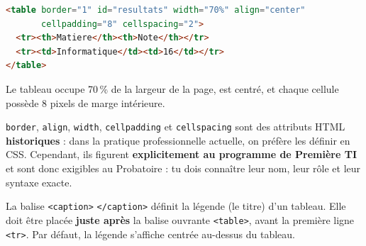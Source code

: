 \documentclass[11pt]{article}
\newcommand{\cle}[1]{{\popxbold\color{popdark}#1}}
\newcounter{popsec}
\newcounter{popsub}
\newcommand{\courssub}[1]{%
  \stepcounter{popsub}%
  \par\vspace{9pt}\noindent{\popxbold\fontsize{11.5}{13}\selectfont\color{popink}{\color{poporange}\thepopsec.\thepopsub}\hspace{6pt}#1}\par\nopagebreak\vspace{4pt}
}
\newcommand{\legende}[1]{\par\vspace{6pt}{\popsemi\fontsize{9}{11.5}\selectfont\color{popmuted}#1}}
\begin{document}
\begin{popfigure}
\end{popfigure}

\begin{exemplebox}
\begin{lstlisting}[language=HTML]
<table border="1" id="resultats" width="70%" align="center"
       cellpadding="8" cellspacing="2">
  <tr><th>Matiere</th><th>Note</th></tr>
  <tr><td>Informatique</td><td>16</td></tr>
</table>
\end{lstlisting}
Le tableau occupe 70\,\% de la largeur de la page, est centré, et chaque cellule possède 8 pixels de marge intérieure.
\end{exemplebox}

\begin{attention}
\texttt{border}, \texttt{align}, \texttt{width}, \texttt{cellpadding} et \texttt{cellspacing} sont des attributs HTML \textbf{historiques} : dans la pratique professionnelle actuelle, on préfère les définir en CSS. Cependant, ils figurent \textbf{explicitement au programme de Première TI} et sont donc exigibles au Probatoire : tu dois connaître leur nom, leur rôle et leur syntaxe exacte.
\end{attention}

\courssub{La légende du tableau : \texttt{<caption>}}

\begin{definition}
La balise \texttt{<caption>} \texttt{</caption>} définit la \cle{légende} (le titre) d'un tableau. Elle doit être placée \textbf{juste après} la balise ouvrante \texttt{<table>}, avant la première ligne \texttt{<tr>}. Par défaut, la légende s'affiche centrée au-dessus du tableau.
\end{definition}
\end{document}
